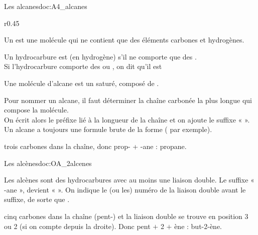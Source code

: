 
\begin{doc}{Les alcanes}{doc:A4_alcanes}
  \begin{wrapfigure}{r}{0.45\linewidth}   
    \vspace*{-30pt}
    \begin{boite}
      \begin{encart}
        Un  est une molécule qui ne contient que des éléments carbones et hydrogènes.
      \end{encart}
      \begin{encart}
        Un hydrocarbure est  (en hydrogène) s'il ne comporte que des . \\
        Si l'hydrocarbure comporte des  ou , on dit qu'il est 
      \end{encart}
    \end{boite}
  \end{wrapfigure}
  \phantom{b}\vspace*{-14pt}
  
  \begin{encart}
    Une molécule d'alcane est un  saturé, composé de .
  \end{encart}
  Pour nommer un alcane, il faut déterminer la chaîne carbonée la plus longue qui compose la molécule. \\
  On écrit alors le préfixe lié à la longueur de la chaîne et on ajoute le suffixe «  ». \\
  Un alcane a toujours une formule brute de la forme  ( par exemple).
  
  \vspace*{4pt}
  \exemple {} trois carbones dans la chaîne, donc prop- + -ane : propane.
\end{doc}



\begin{doc}{Les alcènes}{doc:OA_2alcenes}
  \begin{encart}
    Les alcènes sont des hydrocarbures avec au moins une liaison double.
    Le suffixe « -ane », devient «  ».
    On indique le (ou les) numéro de la liaison double avant le suffixe, de sorte que .
  \end{encart}
  \exemple {} cinq carbones dans la chaîne (pent-) et la liaison double se trouve en position 3 ou 2 (si on compte depuis la droite).
  Donc pent $+$ 2 $+$ ène : but-2-ène.
\end{doc}

